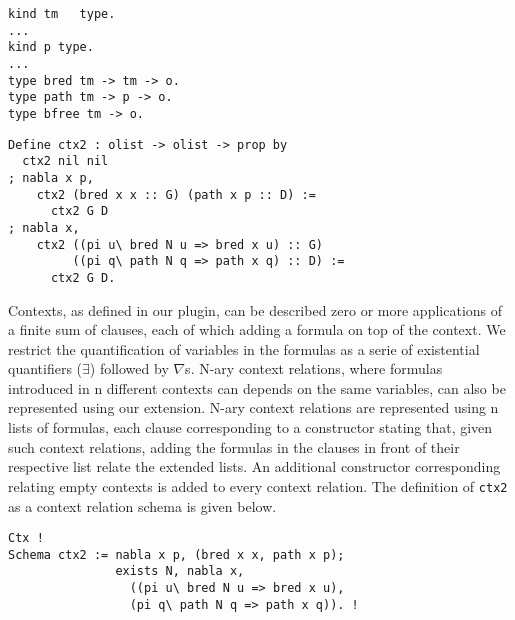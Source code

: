 \documentclass[nocopyrightspace,authoryear]{sigplanconf}
\begin{document}
\begin{lstlisting}
kind tm   type.
...
kind p type.
...
type bred tm -> tm -> o.
type path tm -> p -> o.
type bfree tm -> o.
\end{lstlisting}
\begin{lstlisting}
Define ctx2 : olist -> olist -> prop by
  ctx2 nil nil
; nabla x p,
    ctx2 (bred x x :: G) (path x p :: D) := 
      ctx2 G D
; nabla x,
    ctx2 ((pi u\ bred N u => bred x u) :: G)
         ((pi q\ path N q => path x q) :: D) :=
      ctx2 G D.
\end{lstlisting}

Contexts, as defined in our plugin, can be described zero or more applications of a finite sum of clauses, each of which adding a formula on top of the context. We restrict the quantification of variables in the formulas as a serie of existential quantifiers ($\exists$) followed by $\nabla$s. N-ary context relations, where formulas introduced in  n different contexts can depends on the same variables, can also be represented using our extension. N-ary context relations are represented using n lists of formulas, each clause corresponding to a constructor stating that, given such context relations, adding the formulas in the clauses in front of their respective list relate the extended lists. An additional constructor corresponding relating empty contexts is added to every context relation. The definition of \lstinline|ctx2| as a context relation schema is given below.

\begin{lstlisting}
Ctx !
Schema ctx2 := nabla x p, (bred x x, path x p);
               exists N, nabla x, 
                 ((pi u\ bred N u => bred x u), 
                 (pi q\ path N q => path x q)). !
\end{lstlisting}
\end{document}
